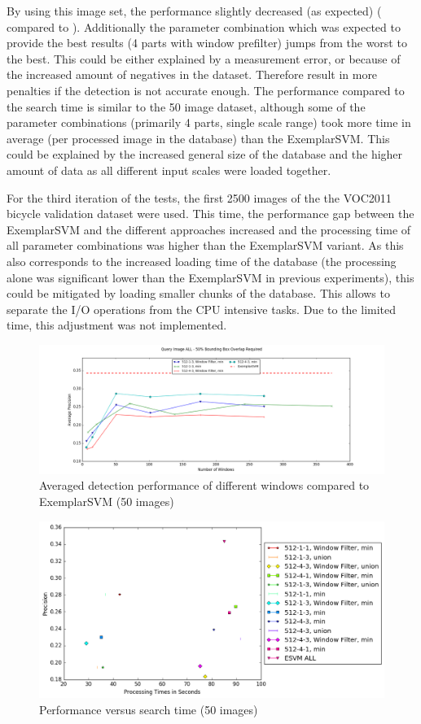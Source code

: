 By using this image set, the performance slightly decreased (as expected) ( compared to ). Additionally the parameter combination which was expected to provide the best results (4 parts with window prefilter) jumps from the worst to the best. This could be either explained by a measurement error, or because of the increased amount of negatives in the dataset. Therefore result in more penalties if the detection is not accurate enough. The performance compared to the search time is similar to the 50 image dataset, although some of the parameter combinations (primarily 4 parts, single scale range) took more time in average (per processed image in the database) than the ExemplarSVM. This could be explained by the increased general size of the database and the higher amount of data as all different input scales were loaded together.

For the third iteration of the tests, the first 2500 images of the the \ac{VOC2011} bicycle validation dataset were used. This time, the performance gap between the ExemplarSVM and the different approaches increased and the processing time of all parameter combinations was higher than the ExemplarSVM variant. As this also corresponds to the increased loading time of the database (the processing alone was significant lower than the ExemplarSVM in previous experiments), this could be mitigated by loading smaller chunks of the database. This allows to separate the I/O operations from the CPU intensive tasks. Due to the limited time, this adjustment was not implemented.


\begin{figure}
\centering
\includegraphics[width=\linewidth]{images/db1_window_comparison-ALL}
\caption{Averaged detection performance of different windows compared to ExemplarSVM (50 images)}
\label{fig:db1_window_comparison-ALL}
\end{figure}


\begin{figure}
\centering
\includegraphics[width=0.7\linewidth]{images/db1_t_vs_p-ALL}
\caption{Performance versus search time (50 images)}
\label{fig:db1_t_vs_p-ALL}
\end{figure}

